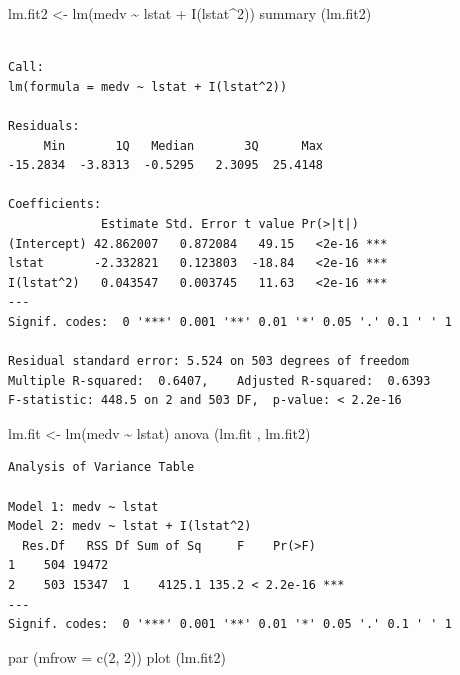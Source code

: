 \documentclass[
  letterpaper,
  DIV=11,
  numbers=noendperiod]{scrartcl}
\newenvironment{Shaded}{\begin{snugshade}}{\end{snugshade}}
\newcommand{\AttributeTok}[1]{\textcolor[rgb]{0.40,0.45,0.13}{#1}}
\newcommand{\DecValTok}[1]{\textcolor[rgb]{0.68,0.00,0.00}{#1}}
\newcommand{\FunctionTok}[1]{\textcolor[rgb]{0.28,0.35,0.67}{#1}}
\newcommand{\NormalTok}[1]{\textcolor[rgb]{0.00,0.23,0.31}{#1}}
\newcommand{\OtherTok}[1]{\textcolor[rgb]{0.00,0.23,0.31}{#1}}
\newcommand{\SpecialCharTok}[1]{\textcolor[rgb]{0.37,0.37,0.37}{#1}}
\begin{document}
\begin{Shaded}
\begin{Highlighting}[]
\NormalTok{lm.fit2 }\OtherTok{\textless{}{-}} \FunctionTok{lm}\NormalTok{(medv }\SpecialCharTok{\textasciitilde{}}\NormalTok{ lstat }\SpecialCharTok{+} \FunctionTok{I}\NormalTok{(lstat}\SpecialCharTok{\^{}}\DecValTok{2}\NormalTok{))}
\FunctionTok{summary}\NormalTok{ (lm.fit2)}
\end{Highlighting}
\end{Shaded}

\begin{verbatim}

Call:
lm(formula = medv ~ lstat + I(lstat^2))

Residuals:
     Min       1Q   Median       3Q      Max 
-15.2834  -3.8313  -0.5295   2.3095  25.4148 

Coefficients:
             Estimate Std. Error t value Pr(>|t|)    
(Intercept) 42.862007   0.872084   49.15   <2e-16 ***
lstat       -2.332821   0.123803  -18.84   <2e-16 ***
I(lstat^2)   0.043547   0.003745   11.63   <2e-16 ***
---
Signif. codes:  0 '***' 0.001 '**' 0.01 '*' 0.05 '.' 0.1 ' ' 1

Residual standard error: 5.524 on 503 degrees of freedom
Multiple R-squared:  0.6407,    Adjusted R-squared:  0.6393 
F-statistic: 448.5 on 2 and 503 DF,  p-value: < 2.2e-16
\end{verbatim}

\begin{Shaded}
\begin{Highlighting}[]
\NormalTok{lm.fit }\OtherTok{\textless{}{-}} \FunctionTok{lm}\NormalTok{(medv }\SpecialCharTok{\textasciitilde{}}\NormalTok{ lstat)}
\FunctionTok{anova}\NormalTok{ (lm.fit , lm.fit2)}
\end{Highlighting}
\end{Shaded}

\begin{verbatim}
Analysis of Variance Table

Model 1: medv ~ lstat
Model 2: medv ~ lstat + I(lstat^2)
  Res.Df   RSS Df Sum of Sq     F    Pr(>F)    
1    504 19472                                 
2    503 15347  1    4125.1 135.2 < 2.2e-16 ***
---
Signif. codes:  0 '***' 0.001 '**' 0.01 '*' 0.05 '.' 0.1 ' ' 1
\end{verbatim}

\begin{Shaded}
\begin{Highlighting}[]
\FunctionTok{par}\NormalTok{ (}\AttributeTok{mfrow =} \FunctionTok{c}\NormalTok{(}\DecValTok{2}\NormalTok{, }\DecValTok{2}\NormalTok{))}
\FunctionTok{plot}\NormalTok{ (lm.fit2)}
\end{Highlighting}
\end{Shaded}
\end{document}
